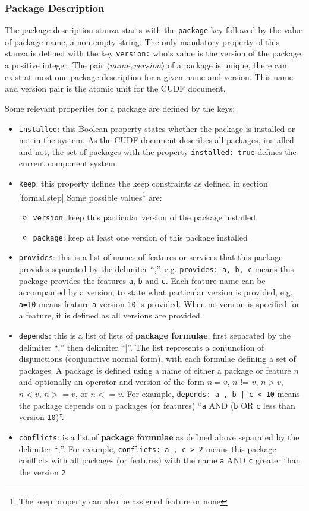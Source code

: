 \subsubsection{Package Description}
The package description stanza starts with the \verb+package+ key followed by the value of package name, a non-empty string.
The only mandatory property of this stanza is defined with the key \verb+version:+ who's value is the version of the package, a positive integer.
The pair $\langle name, version \rangle$ of a package is unique, there can exist at most one package description for a given name and version.
This name and version pair is the atomic unit for the CUDF document. 

Some relevant properties for a package are defined by the keys:
\begin{itemize}
  \item \verb+installed+: this Boolean property states whether the package is installed or not in the system. 
  As the CUDF document describes all packages, installed and not, the set of packages with the property \verb+installed: true+ defines the current component system.
  \item \verb+keep+: this property defines the keep constraints as defined in section \ref{formal.step}
  Some possible values\footnote{The keep property can also be assigned feature or none} are:
	  	\begin{itemize}
	  		\item \verb+version+: keep this particular version of the package installed
	  		\item \verb+package+: keep at least one version of this package installed
		\end{itemize}
  \item \verb+provides+: this is a list of names of features or services that this package provides separated by the delimiter ``,''.
  e.g. \verb+provides: a, b, c+ means this package provides the features \verb+a+, \verb+b+ and \verb+c+.
  Each feature name can be accompanied by a version, to state what particular version is provided, e.g. \verb+a=10+ means feature \verb+a+ version \verb+10+ is provided.
  When no version is specified for a feature, it is defined as all versions are provided.
  \item \verb+depends+: this is a list of lists of \textbf{package formulae}, first separated by the delimiter ``,'' then delimiter ``|''.
  The list represents a conjunction of disjunctions (conjunctive normal form), with each formulae defining a set of packages.
  A package is defined using a name of either a package or feature $n$ and optionally an operator and version of the form  $n = v$, $n$ != $v$, $n > v$, $n < v$, $n >= v$, or $n <= v$.
  For example, \verb+depends: a , b | c < 10+ means the package depends on a packages (or features) ``\verb+a+ AND (\verb+b+ OR \verb+c+ less than version \verb+10+)''.  
  \item \verb+conflicts+: is a list of \textbf{package formulae} as defined above separated by the delimiter ``,''.
  For example, \verb+conflicts: a , c > 2+ means this package conflicts with all packages (or features) with the name \verb+a+ AND \verb+c+ greater than the version \verb+2+
\end{itemize}

